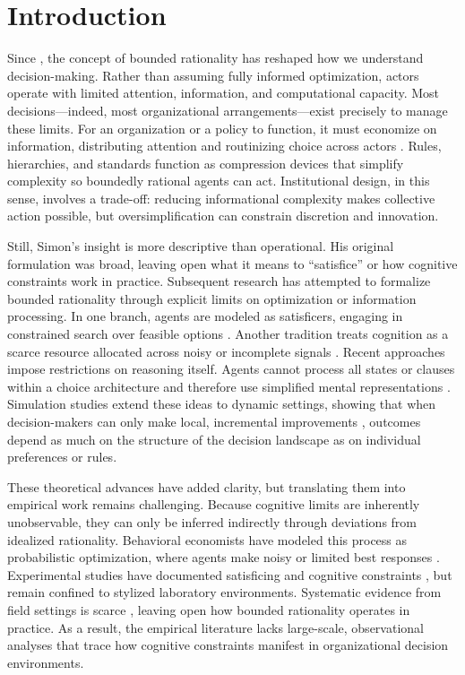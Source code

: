 \section{Introduction}\label{sec_intro}

Since \citet{Simon1955}, the concept of bounded rationality has reshaped how we understand decision-making. Rather than assuming fully informed optimization, actors operate with limited attention, information, and computational capacity. Most decisions---indeed, most organizational arrangements---exist precisely to manage these limits. For an organization or a policy to function, it must economize on information, distributing attention and routinizing choice across actors \citep{CyertMarch1963}. Rules, hierarchies, and standards function as compression devices that simplify complexity so boundedly rational agents can act. Institutional design, in this sense, involves a trade-off: reducing informational complexity makes collective action possible, but oversimplification can constrain discretion and innovation.

Still, Simon's insight is more descriptive than operational. His original formulation was broad, leaving open what it means to ``satisfice'' or how cognitive constraints work in practice. Subsequent research has attempted to formalize bounded rationality through explicit limits on optimization or information processing. In one branch, agents are modeled as satisficers, engaging in constrained search over feasible options \citep{Stigler1961,Rubinstein1986,Salant2011}. Another tradition treats cognition as a scarce resource allocated across noisy or incomplete signals \citep{Radner1993,VanZandt1999,Sims2003,HebertWoodford2023}. Recent approaches impose restrictions on reasoning itself. Agents cannot process all states or clauses within a choice architecture and therefore use simplified mental representations \citep{ZhangLevin2017,Jakobsen2020}. Simulation studies extend these ideas to dynamic settings, showing that when decision-makers can only make local, incremental improvements \citep{Levinthal1997,MarengoDosi2005,Richters2021}, outcomes depend as much on the structure of the decision landscape as on individual preferences or rules.

These theoretical advances have added clarity, but translating them into empirical work remains challenging. Because cognitive limits are inherently unobservable, they can only be inferred indirectly through deviations from idealized rationality. Behavioral economists have modeled this process as probabilistic optimization, where agents make noisy or limited best responses \citep{McKelveyPalfrey1995,CamererHoChong2004}. Experimental studies have documented satisficing and cognitive constraints \citep{Guth2010,LimMatrosTurocy2014,AlaouiJanezicPenta2020}, but remain confined to stylized laboratory environments. Systematic evidence from field settings is scarce \citep{Kirman2010,FehrSchmidt1999}, leaving open how bounded rationality operates in practice. As a result, the empirical literature lacks large-scale, observational analyses that trace how cognitive constraints manifest in organizational decision environments.

